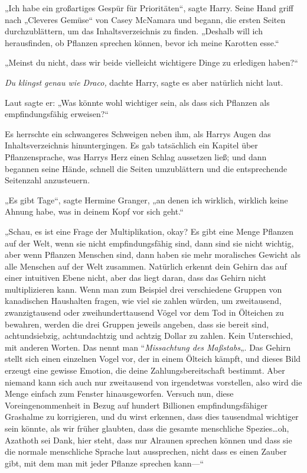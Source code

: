 {„Ich habe ein großartiges Gespür für Prioritäten“, sagte Harry. Seine Hand griff nach „Cleveres Gemüse“ von Casey McNamara und begann, die ersten Seiten durchzublättern, um das Inhaltsverzeichnis zu finden. „Deshalb will ich herausfinden, ob Pflanzen sprechen können, bevor ich meine Karotten esse.“

„Meinst du nicht, dass wir beide vielleicht wichtigere Dinge zu erledigen haben?“

\emph{Du klingst genau wie Draco,} dachte Harry, sagte es aber natürlich nicht laut.

Laut sagte er: „Was könnte wohl wichtiger sein, als dass sich Pflanzen als empfindungsfähig erweisen?“

Es herrschte ein schwangeres Schweigen neben ihm, als Harrys Augen das Inhaltsverzeichnis hinuntergingen. Es gab tatsächlich ein Kapitel über Pflanzensprache, was Harrys Herz einen Schlag aussetzen ließ; und dann begannen seine Hände, schnell die Seiten umzublättern und die entsprechende Seitenzahl anzusteuern.

„Es gibt Tage“, sagte Hermine Granger, „an denen ich wirklich, wirklich keine Ahnung habe, was in deinem Kopf vor sich geht.“

„Schau, es ist eine Frage der Multiplikation, okay? Es gibt eine Menge Pflanzen auf der Welt, wenn sie nicht empfindungsfähig sind, dann sind sie nicht wichtig, aber wenn Pflanzen Menschen sind, dann haben sie mehr moralisches Gewicht als alle Menschen auf der Welt zusammen. Natürlich erkennt dein Gehirn das auf einer intuitiven Ebene nicht, aber das liegt daran, dass das Gehirn nicht multiplizieren kann. Wenn man zum Beispiel drei verschiedene Gruppen von kanadischen Haushalten fragen, wie viel sie zahlen würden, um zweitausend, zwanzigtausend oder zweihunderttausend Vögel vor dem Tod in Ölteichen zu bewahren, werden die drei Gruppen jeweils angeben, dass sie bereit sind, achtundsiebzig, achtundachtzig und achtzig Dollar zu zahlen. Kein Unterschied, mit anderen Worten. Das nennt man “\emph{Missachtung des Maßstabs}„. Das Gehirn stellt sich einen einzelnen Vogel vor, der in einem Ölteich kämpft, und dieses Bild erzeugt eine gewisse Emotion, die deine Zahlungsbereitschaft bestimmt. Aber niemand kann sich auch nur zweitausend von irgendetwas vorstellen, also wird die Menge einfach zum Fenster hinausgeworfen. Versuch nun, diese Voreingenommenheit in Bezug auf hundert Billionen empfindungsfähiger Grashalme zu korrigieren, und du wirst erkennen, dass dies tausendmal wichtiger sein könnte, als wir früher glaubten, dass die gesamte menschliche Spezies…oh, Azathoth sei Dank, hier steht, dass nur Alraunen sprechen können und dass sie die normale menschliche Sprache laut aussprechen, nicht dass es einen Zauber gibt, mit dem man mit jeder Pflanze sprechen kann—“

}
